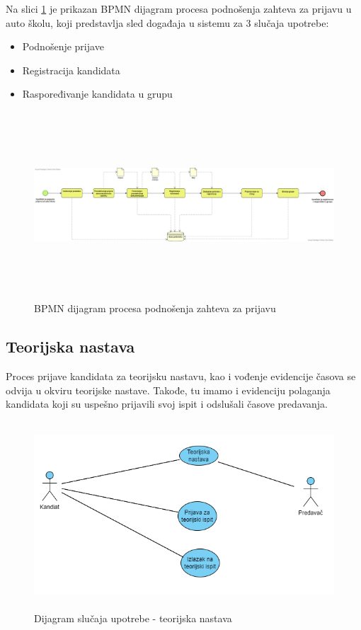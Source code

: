 Na slici \ref{fig:bpmn_podnosenje_zahteva} je prikazan BPMN dijagram procesa podnošenja zahteva za prijavu u auto školu,
koji predstavlja sled događaja u sistemu za 3 slučaja upotrebe:
\begin{itemize}
    \item Podnošenje prijave
    \item Registracija kandidata
    \item Raspoređivanje kandidata u grupu
\end{itemize}

\begin{figure}[H]
    \begin{center}
        \includegraphics[width=170mm, height = 70mm]{Diagrams/bpmn_podnosenje_zahteva.png}
    \end{center}
    \caption {BPMN dijagram procesa podnošenja zahteva za prijavu}
    \label{fig:bpmn_podnosenje_zahteva}

\end{figure}


\subsection {Teorijska nastava}
Proces prijave kandidata za teorijsku nastavu, kao i vođenje evidencije časova se odvija u okviru teorijske nastave. 
Takođe, tu imamo i evidenciju polaganja kandidata koji su uspešno prijavili svoj ispit i odslušali časove predavanja.

\begin{figure}[H]
  \begin{center}
      \includegraphics[width=150mm, height=70mm]{Diagrams/diagram teorijska nastava.png}
  \end{center}
  \caption {Dijagram slučaja upotrebe - teorijska nastava}
  \label{theory}

\end{figure}

